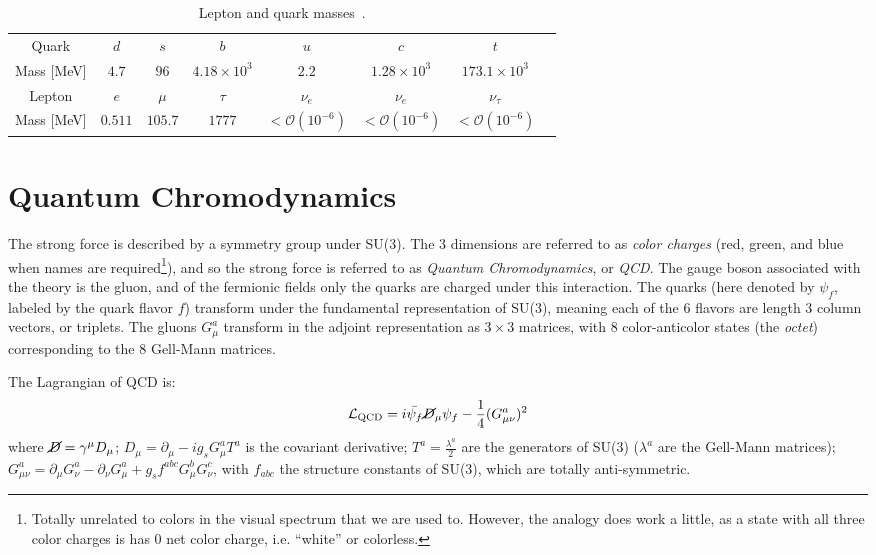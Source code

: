 \begin{table}[]
\centering
\caption{Lepton and quark masses~\cite{PDG}.}
\label{tab:SM:masses}
\begin{tabular}{c c c c c c c c}
\hline
Quark & $d$ & $s$ & $b$ & $u$ & $c$ & $t$ & \\
Mass [MeV] & $4.7$ & $96$ & $4.18\times10^3$ & $2.2$ & $1.28\times10^3$ & $173.1\times10^3$\\
\hline
Lepton & $e$ & $\mu$ & $\tau$ & $\nu_e$ & $\nu_e$ & $\nu_\tau$ & \\
Mass [MeV] & $0.511$ & $105.7$ & $1777$ & $<\mathcal{O}(10^{-6})$ & $<\mathcal{O}(10^{-6})$ & $<\mathcal{O}(10^{-6})$
\end{tabular}
\end{table}

\section{Quantum Chromodynamics}
\label{sec:SM:QCD}
The strong force is described by a symmetry group under SU(3).
The $3$ dimensions are referred to as \textit{color charges} (red, green, and blue when names are required\footnote{Totally unrelated to colors in the visual spectrum that we are used to. However, the analogy does work a little, as a state with all three color charges is has $0$ net color charge, i.e. ``white'' or colorless.}), and so the strong force is referred to as \textit{Quantum Chromodynamics}, or \textit{QCD}.
The gauge boson associated with the theory is the gluon, and of the fermionic fields only the quarks are charged under this interaction.
The quarks (here denoted by $\psi_f$, labeled by the quark flavor $f$) transform under the fundamental representation of SU(3), meaning each of the $6$ flavors are length $3$ column vectors, or triplets.
The gluons $G_\mu^a$ transform in the adjoint representation as $3\times 3$ matrices, with $8$ color-anticolor states (the \textit{octet}) corresponding to the $8$ Gell-Mann matrices.

The Lagrangian of QCD is:
\begin{align}
  \mathcal{L}_\text{QCD} = i\bar{\psi_f}\cancel{D}_\mu\psi_f-\frac{1}{4}(G_{\mu\nu}^a)^2
\end{align}
where $\cancel{D}=\gamma^\mu D_\mu$; $D_\mu = \partial_\mu - ig_sG_\mu^aT^a$ is the covariant derivative; $T^a=\frac{\lambda^a}{2}$ are the generators of SU(3) ($\lambda^a$ are the Gell-Mann matrices); $G_{\mu\nu}^a = \partial_\mu G_\nu^a-\partial_\nu G_\mu^a + g_s f^{abc} G_\mu^b G_\nu^c$, with $f_{abc}$ the structure constants of SU(3), which are totally anti-symmetric.

